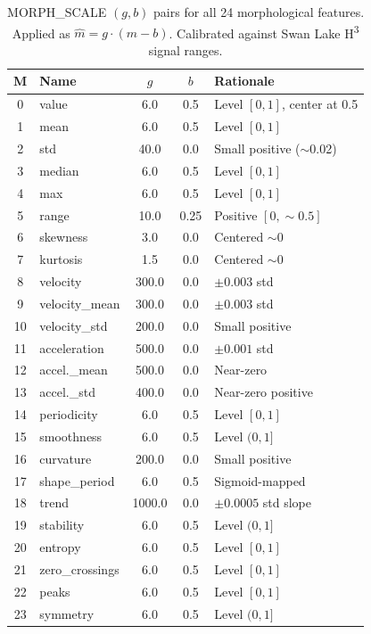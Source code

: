 \documentclass[10pt,twocolumn]{article}
\newcommand{\Htri}{H\textsuperscript{3}}
\begin{document}
\begin{table}[H]
\centering
\caption{MORPH\_SCALE $(g, b)$ pairs for all 24 morphological features. Applied as $\hat{m} = g \cdot (m - b)$. Calibrated against Swan Lake \Htri{} signal ranges.}
\small
\begin{tabular}{@{}clccl@{}}
\toprule
\textbf{M} & \textbf{Name} & \textbf{$g$} & \textbf{$b$} & \textbf{Rationale} \\
\midrule
0  & value            & 6.0   & 0.5  & Level $[0,1]$, center at 0.5 \\
1  & mean             & 6.0   & 0.5  & Level $[0,1]$ \\
2  & std              & 40.0  & 0.0  & Small positive ($\sim$0.02) \\
3  & median           & 6.0   & 0.5  & Level $[0,1]$ \\
4  & max              & 6.0   & 0.5  & Level $[0,1]$ \\
5  & range            & 10.0  & 0.25 & Positive $[0, \sim 0.5]$ \\
6  & skewness         & 3.0   & 0.0  & Centered $\sim 0$ \\
7  & kurtosis         & 1.5   & 0.0  & Centered $\sim 0$ \\
8  & velocity         & 300.0 & 0.0  & $\pm 0.003$ std \\
9  & velocity\_mean   & 300.0 & 0.0  & $\pm 0.003$ std \\
10 & velocity\_std    & 200.0 & 0.0  & Small positive \\
11 & acceleration     & 500.0 & 0.0  & $\pm 0.001$ std \\
12 & accel.\_mean     & 500.0 & 0.0  & Near-zero \\
13 & accel.\_std      & 400.0 & 0.0  & Near-zero positive \\
14 & periodicity      & 6.0   & 0.5  & Level $[0,1]$ \\
15 & smoothness       & 6.0   & 0.5  & Level $(0,1]$ \\
16 & curvature        & 200.0 & 0.0  & Small positive \\
17 & shape\_period    & 6.0   & 0.5  & Sigmoid-mapped \\
18 & trend            & 1000.0& 0.0  & $\pm 0.0005$ std slope \\
19 & stability        & 6.0   & 0.5  & Level $(0,1]$ \\
20 & entropy          & 6.0   & 0.5  & Level $[0,1]$ \\
21 & zero\_crossings  & 6.0   & 0.5  & Level $[0,1]$ \\
22 & peaks            & 6.0   & 0.5  & Level $[0,1]$ \\
23 & symmetry         & 6.0   & 0.5  & Level $(0,1]$ \\
\bottomrule
\end{tabular}
\end{table}
\end{document}
